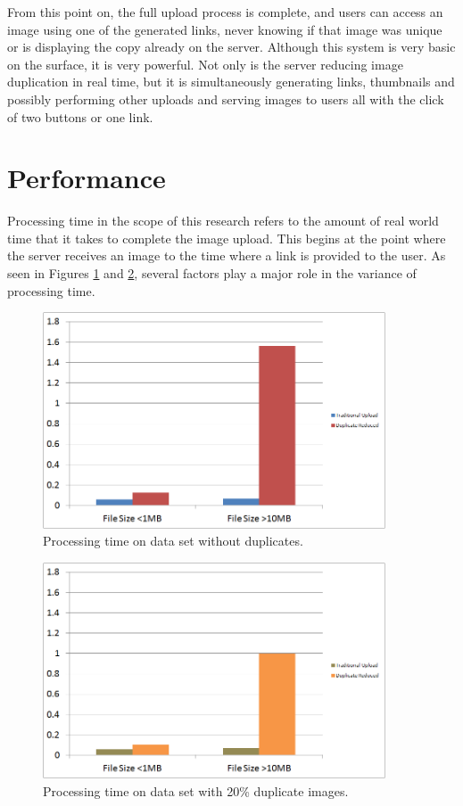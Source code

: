 From this point on, the full upload process is complete, and users can access an image using one of the generated links, never knowing if that image was unique or is displaying the copy already on the server. Although this system is very basic on the surface, it is very powerful. Not only is the server reducing image duplication in real time, but it is simultaneously generating links, thumbnails and possibly performing other uploads and serving images to users all with the click of two buttons or one link.

\section{Performance}
Processing time in the scope of this research refers to the amount of real world time that it takes to complete the image upload. This begins at the point where the server receives an image to the time where a link is provided to the user. As seen in Figures \ref{fig:proctimenodup} and \ref{fig:proctimemixdup}, several factors play a major role in the variance of processing time.

\begin{figure}[htbp]
\centering
\includegraphics[width=4in]{proctimenodup}
\caption{Processing time on data set without duplicates.}
\label{fig:proctimenodup}
\end{figure}

\begin{figure}[htbp]
\centering
\includegraphics[width=4in]{proctimemixdup}
\caption{Processing time on data set with 20\% duplicate images.}
\label{fig:proctimemixdup}
\end{figure}

